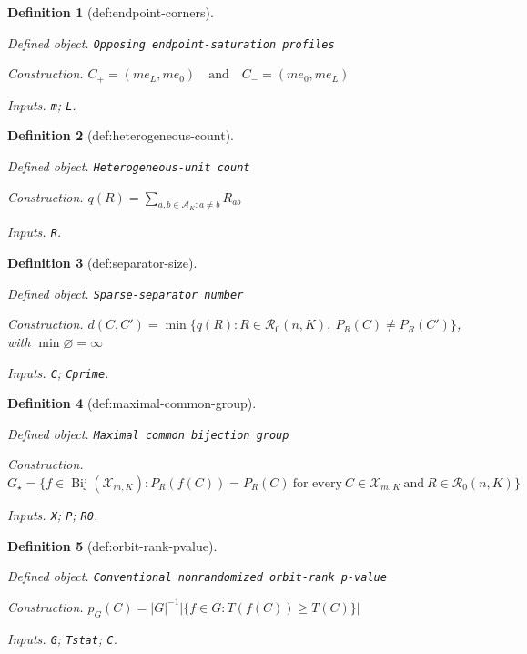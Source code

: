 \documentclass{article}
\newtheorem{definition}{Definition}
\begin{document}
\begin{definition}[def:endpoint-corners]\label{def:endpoint-corners}
\par\smallskip\noindent\emph{Defined object.} \texttt{Opposing endpoint-\allowbreak{}saturation profiles}
\par\smallskip\noindent\emph{Construction.} \(C_+=(me_L,me_0)\quad\text{and}\quad C_-=(me_0,me_L)\)
\par\smallskip\noindent\emph{Inputs.} \texttt{m}; \texttt{L}.
\end{definition}

\begin{definition}[def:heterogeneous-count]\label{def:heterogeneous-count}
\par\smallskip\noindent\emph{Defined object.} \texttt{Heterogeneous-\allowbreak{}unit count}
\par\smallskip\noindent\emph{Construction.} \(q(R)=\sum_{a,b\in\mathcal A_K:a\neq b}R_{ab}\)
\par\smallskip\noindent\emph{Inputs.} \texttt{R}.
\end{definition}

\begin{definition}[def:separator-size]\label{def:separator-size}
\par\smallskip\noindent\emph{Defined object.} \texttt{Sparse-\allowbreak{}separator number}
\par\smallskip\noindent\emph{Construction.} \(d(C,C')=\min\{q(R):R\in\mathcal R_0(n,K),\ P_R(C)\neq P_R(C')\}\), with \(\min\varnothing=\infty\)
\par\smallskip\noindent\emph{Inputs.} \texttt{C}; \texttt{Cprime}.
\end{definition}

\begin{definition}[def:maximal-common-group]\label{def:maximal-common-group}
\par\smallskip\noindent\emph{Defined object.} \texttt{Maximal common bijection group}
\par\smallskip\noindent\emph{Construction.} \(G_\star=\{f\in\operatorname{Bij}(\mathcal X_{m,K}):P_R(f(C))=P_R(C)\ \text{for every}\ C\in\mathcal X_{m,K}\ \text{and}\ R\in\mathcal R_0(n,K)\}\)
\par\smallskip\noindent\emph{Inputs.} \texttt{X}; \texttt{P}; \texttt{R0}.
\end{definition}

\begin{definition}[def:orbit-rank-pvalue]\label{def:orbit-rank-pvalue}
\par\smallskip\noindent\emph{Defined object.} \texttt{Conventional nonrandomized orbit-\allowbreak{}rank p-\allowbreak{}value}
\par\smallskip\noindent\emph{Construction.} \(p_G(C)=|G|^{-1}|\{f\in G:T(f(C))\geq T(C)\}|\)
\par\smallskip\noindent\emph{Inputs.} \texttt{G}; \texttt{Tstat}; \texttt{C}.
\end{definition}
\end{document}
